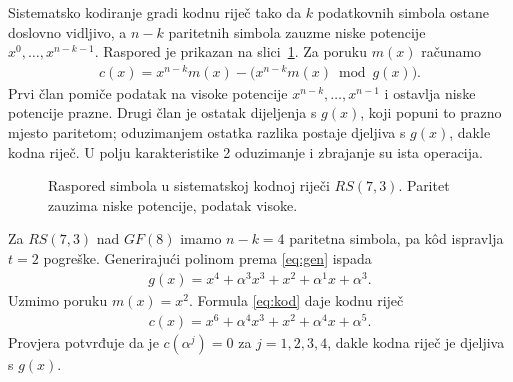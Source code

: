 \documentclass{mathos}
\begin{document}
\noindent
Sistematsko kodiranje gradi kodnu riječ tako da $k$ podatkovnih simbola ostane doslovno vidljivo, a $n-k$ paritetnih simbola zauzme niske potencije $x^0, \dots, x^{n-k-1}$. Raspored je prikazan na slici~\ref{fig:rijec}. Za poruku $m(x)$ računamo
\begin{align}\label{eq:kod}
    c(x) = x^{n-k} m(x) - \big(x^{n-k} m(x) \bmod g(x)\big).
\end{align}
Prvi član pomiče podatak na visoke potencije $x^{n-k}, \dots, x^{n-1}$ i ostavlja niske potencije prazne. Drugi član je ostatak dijeljenja s $g(x)$, koji popuni to prazno mjesto paritetom; oduzimanjem ostatka razlika postaje djeljiva s $g(x)$, dakle kodna riječ. U polju karakteristike 2 oduzimanje i zbrajanje su ista operacija.

\begin{figure}[hbtp]
\centering
{}
\caption{Raspored simbola u sistematskoj kodnoj riječi $RS(7,3)$. Paritet zauzima niske potencije, podatak visoke.}
\label{fig:rijec}
\end{figure}

\begin{primjer}\label{prim:kod}
Za $RS(7,3)$ nad $GF(8)$ imamo $n-k = 4$ paritetna simbola, pa kôd ispravlja $t = 2$ pogreške. Generirajući polinom prema \eqref{eq:gen} ispada
\begin{align*}
    g(x) = x^4 + \alpha^3 x^3 + x^2 + \alpha^1 x + \alpha^3.
\end{align*}
Uzmimo poruku $m(x) = x^2$. Formula \eqref{eq:kod} daje kodnu riječ
\begin{align*}
    c(x) = x^6 + \alpha^4 x^3 + x^2 + \alpha^4 x + \alpha^5.
\end{align*}
Provjera potvrđuje da je $c(\alpha^j) = 0$ za $j = 1, 2, 3, 4$, dakle kodna riječ je djeljiva s $g(x)$.
\end{primjer}
\end{document}

